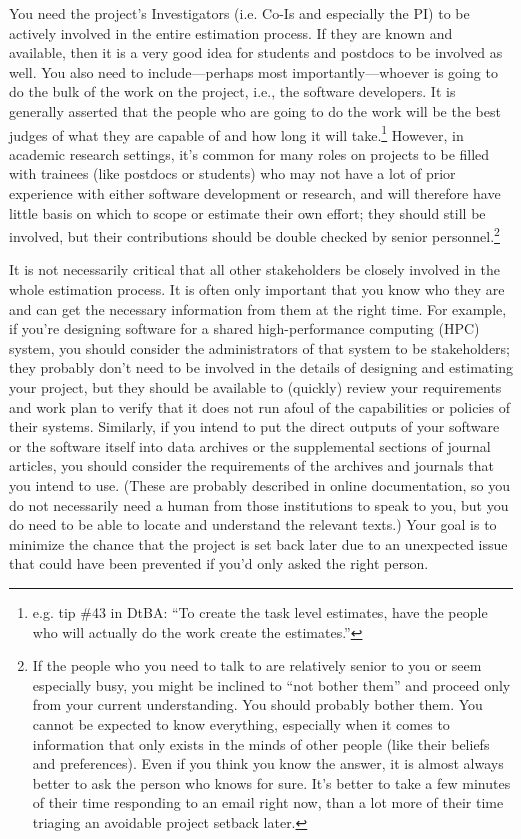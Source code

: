 \documentclass[12pt,oneside]{book}
\begin{document}
You need the project's Investigators (i.e. Co-Is and especially the PI) to be actively involved in the entire estimation process. If they are known and available, then it is a very good idea for students and postdocs to be involved as well. You also need to include---perhaps most importantly---whoever is going to do the bulk of the work on the project, i.e., the software developers. It is generally asserted that the people who are going to do the work will be the best judges of what they are capable of and how long it will take.\footnote{
e.g. tip \#43 in DtBA: ``To create the task level estimates, have the people who will actually do the work create the estimates.''}
However, in academic research settings, it's common for many roles on projects to be filled with trainees (like postdocs or students) who may not have a lot of prior experience with either software development or research, and will therefore have little basis on which to scope or estimate their own effort; they should still be involved, but their contributions should be double checked by senior personnel.\footnote{
If the people who you need to talk to are relatively senior to you or seem especially busy, you might be inclined to “not bother them” and proceed only from your current understanding. You should probably bother them. You cannot be expected to know everything, especially when it comes to information that only exists in the minds of other people (like their beliefs and preferences). Even if you think you know the answer, it is almost always better to ask the person who knows for sure. It’s better to take a few minutes of their time responding to an email right now, than a lot more of their time triaging an avoidable project setback later.}

It is not necessarily critical that all other stakeholders be closely involved in the whole estimation process. It is often only important that you know who they are and can get the necessary information from them at the right time. For example, if you're designing software for a shared high-performance computing (HPC) system, you should consider the administrators of that system to be stakeholders; they probably don't need to be involved in the details of designing and estimating your project, but they should be available to (quickly) review your requirements and work plan to verify that it does not run afoul of the capabilities or policies of their systems. Similarly, if you intend to put the direct outputs of your software or the software itself into data archives or the supplemental sections of journal articles, you should consider the requirements of the archives and journals that you intend to use. (These are probably described in online documentation, so you do not necessarily need a human from those institutions to speak to you, but you do need to be able to locate and understand the relevant texts.) Your goal is to minimize the chance that the project is set back later due to an unexpected issue that could have been prevented if you'd only asked the right person.
\end{document}
